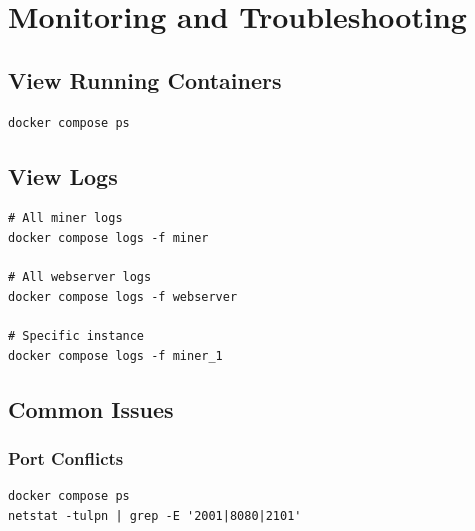 \section{Monitoring and Troubleshooting}
\label{sec:docker-troubleshooting}

\subsection{View Running Containers}

\begin{listing}[H]
\caption{Check Container Status}
\label{lst:ch22-status}
\begin{verbatim}
docker compose ps
\end{verbatim}
\end{listing}

\subsection{View Logs}

\begin{listing}[H]
\caption{Monitor Container Logs}
\label{lst:ch22-logs}
\begin{verbatim}
# All miner logs
docker compose logs -f miner

# All webserver logs
docker compose logs -f webserver

# Specific instance
docker compose logs -f miner_1
\end{verbatim}
\end{listing}

\subsection{Common Issues}

\subsubsection{Port Conflicts}

\begin{listing}[H]
\caption{Diagnose Port Conflicts}
\label{lst:ch22-port-conflicts}
\begin{verbatim}
docker compose ps
netstat -tulpn | grep -E '2001|8080|2101'
\end{verbatim}
\end{listing}

